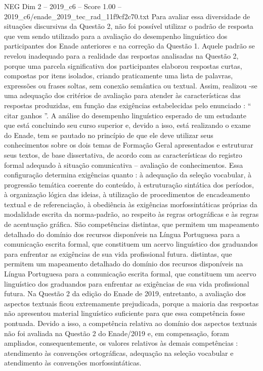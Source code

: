 \begin{textsample}{NEG Dim 2 – 2019\_c6 – Score 1.00 – 2019\_c6/enade\_2019\_tec\_rad\_11f9cf2c70.txt}
Para avaliar essa diversidade de situações discursivas da Questão 2, não foi possível utilizar o padrão de resposta que vem sendo utilizado para a avaliação do desempenho linguístico dos participantes dos Enade anteriores e na correção da Questão 1.
Aquele padrão se revelou inadequado para a realidade das respostas analisadas na Questão 2, porque uma parcela significativa dos participantes elaborou respostas curtas, compostas por itens isolados, criando praticamente uma lista de palavras, expressões ou frases soltas, sem conexão semântica ou textual.
Assim, realizou -se uma adequação dos critérios de avaliação para atender às características das respostas produzidas, em função das exigências estabelecidas pelo enunciado : “ citar ganhos ”.
A análise do desempenho linguístico esperado de um estudante que está concluindo seu curso superior e, devido a isso, está realizando o exame do Enade, tem se pautado no princípio de que ele deve utilizar seus conhecimentos sobre os dois temas de Formação Geral apresentados e estruturar seus textos, de base dissertativa, de acordo com as características do registro formal adequado à situação comunicativa – avaliação de conhecimentos.
Essa configuração determina exigências quanto : à adequação da seleção vocabular, à progressão temática coerente do conteúdo, à estruturação sintática dos períodos, à organização lógica das ideias, à utilização de procedimentos de encadeamento textual e de referenciação, à obediência às exigências morfossintáticas próprias da modalidade escrita da norma-padrão, ao respeito às regras ortográficas e às regras de acentuação gráfica.
São competências distintas, que permitem um mapeamento detalhado do domínio dos recursos disponíveis na Língua Portuguesa para a comunicação escrita formal, que constituem um acervo linguístico dos graduandos para enfrentar as exigências de sua vida profissional futura. distintas, que permitem um mapeamento detalhado do domínio dos recursos disponíveis na Língua Portuguesa para a comunicação escrita formal, que constituem um acervo linguístico dos graduandos para enfrentar as exigências de sua vida profissional futura.
Na Questão 2 da edição do Enade de 2019, entretanto, a avaliação dos aspectos textuais ficou extremamente prejudicada, porque a maioria das respostas não apresentou material linguístico suficiente para que essa competência fosse pontuada.
Devido a isso, a competência relativa ao domínio dos aspectos textuais não foi avaliada na Questão 2 do Enade/2019 e, em compensação, foram ampliados, consequentemente, os valores relativos às demais competências : atendimento às convenções ortográficas, adequação na seleção vocabular e atendimento às convenções morfossintáticas.

\end{textsample}
